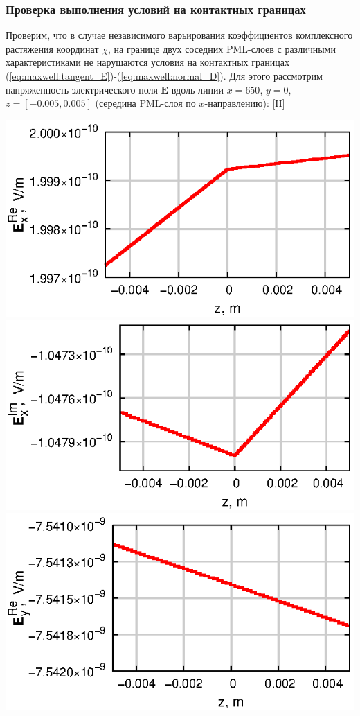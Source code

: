 \documentclass[a4paper,14pt]{article}
\makeatletter
\renewenvironment{figure}[1][\fps@figure]{
  \edef\@tempa{\noexpand\@float{figure}[#1]}
  \@tempa
  \addtocounter{foofigure}{1}
}{
  \end@float
}
\makeatother
\begin{document}
\subsubsection{Проверка выполнения условий на контактных границах}
Проверим, что в случае независимого варьирования коэффициентов комплексного растяжения координат $\chi$, на границе двух соседних PML-слоев с различными характеристиками не нарушаются условия на контактных границах (\ref{eq:maxwell:tangent_E})-(\ref{eq:maxwell:normal_D}). Для этого рассмотрим напряженность электрического поля $\mathbf{E}$ вдоль линии $x = 650$, $y = 0$, $z = [-0.005, 0.005]$ (середина PML-слоя по $x$-направлению):
\begin{figure}[H]
	\centering
	\includegraphics[scale=1]{research-2/650/ExR.eps}
	\includegraphics[scale=1]{research-2/650/ExI.eps}
	\includegraphics[scale=1]{research-2/650/EyR.eps}

\end{figure}
\end{document}
